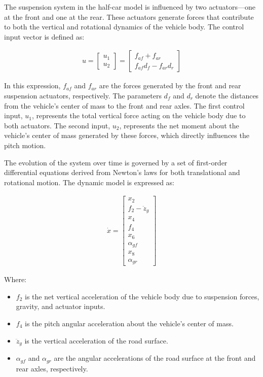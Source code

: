 \documentclass[]{report}
\begin{document}
The suspension system in the half-car model is influenced by two actuators—one at the front and one at the rear. These actuators generate forces that contribute to both the vertical and rotational dynamics of the vehicle body. The control input vector is defined as:


\begin{align}
	u = \begin{bmatrix}
		u_1 \\
		u_2
	\end{bmatrix} =
	\begin{bmatrix}
		f_{af} + f_{ar} \\
		f_{af} d_f - f_{ar} d_r
	\end{bmatrix}
\end{align}

In this expression, $f_{af}$ and $f_{ar}$ are the forces generated by the front and rear suspension actuators, respectively. The parameters $d_f$ and $d_r$ denote the distances from the vehicle's center of mass to the front and rear axles. The first control input, $u_1$, represents the total vertical force acting on the vehicle body due to both actuators. The second input, $u_2$, represents the net moment about the vehicle’s center of mass generated by these forces, which directly influences the pitch motion.


The evolution of the system over time is governed by a set of first-order differential equations derived from Newton’s laws for both translational and rotational motion. The dynamic model is expressed as:

\begin{align}
	\dot{x} = \begin{bmatrix}
		x_2 \\
		f_2 - \ddot{z}_g \\
		x_4 \\
		f_4 \\
		x_6 \\
		\alpha_{gf} \\
		x_8 \\
		\alpha_{gr}
	\end{bmatrix}
\end{align}

Where:
\begin{itemize}
	\item $f_2$ is the net vertical acceleration of the vehicle body due to suspension forces, gravity, and actuator inputs.
	\item $f_4$ is the pitch angular acceleration about the vehicle’s center of mass.
	\item $\ddot{z}_g$ is the vertical acceleration of the road surface.
	\item $\alpha_{gf}$ and $\alpha_{gr}$ are the angular accelerations of the road surface at the front and rear axles, respectively.
\end{itemize}
\end{document}
